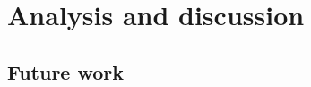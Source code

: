 \documentclass[12pt, a4paper]{article}
\begin{document}




\section{Analysis and discussion}





\subsection{Future work}








\pagebreak


\end{document}
